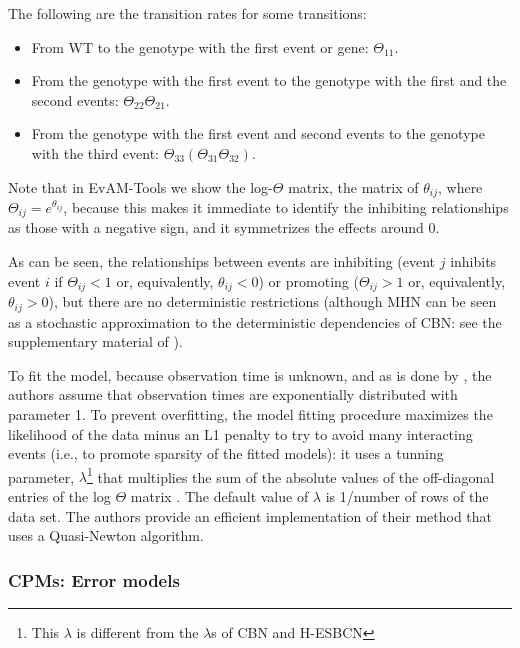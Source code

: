 \documentclass[a4paper,11pt]{article}
\begin{document}
The following are the transition rates for some transitions:
\begin{itemize}
\item From WT to the genotype with the first event or gene: $\Theta_{11}$.

\item From the genotype with the first event to the genotype with the first and the second events: $\Theta_{22} \Theta_{21}$.
\item From the genotype with the first event and second events to the genotype with the third event: $\Theta_{33} (\Theta_{31} \Theta_{32})$.
\end{itemize}

Note that in EvAM-Tools we show the log-$\Theta$ matrix, the matrix of $\theta_{ij}$, where $\Theta_{ij} = e^{\theta_{ij}}$, because this makes it immediate to identify the inhibiting relationships as those with a negative sign, and it symmetrizes the effects around 0.


As can be seen, the relationships between events are inhibiting (event $j$ inhibits event $i$ if $\Theta_{ij} < 1$ or, equivalently, $\theta_{ij} < 0$) or promoting ($\Theta_{ij} > 1$ or, equivalently, $\theta_{ij} > 0$), but there are no deterministic restrictions (although MHN can be seen as a stochastic approximation to the deterministic dependencies of CBN: see the supplementary material of \citealp{schill2020modelling}).




To fit the model, because observation time is unknown, and as is done by \citet{gerstung2009quantifying}, the authors assume that observation times are exponentially distributed with parameter 1. To prevent overfitting,  the model fitting procedure maximizes the likelihood of the data minus an L1 penalty to try to avoid many interacting events (i.e., to promote sparsity of the fitted models): it uses a tunning parameter, $\lambda$\footnote{This $\lambda$ is different from the $\lambda$s of CBN and H-ESBCN} that multiplies the sum of the absolute values of the off-diagonal entries of the log $\Theta$ matrix \citep[eq.~6]{schill2020modelling}. The default value of $\lambda$ is 1/number of rows of the data set. The authors provide an efficient implementation of their method that uses a Quasi-Newton algorithm.



  
\subsubsection{CPMs: Error models}
\label{error_models}
\end{document}

